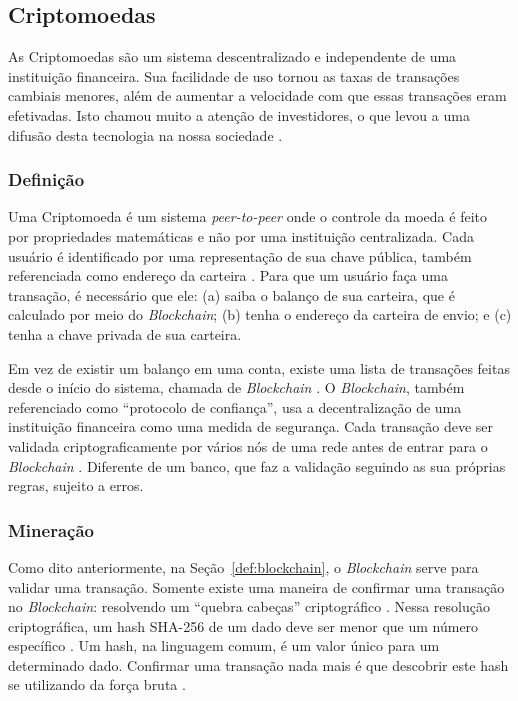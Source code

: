 \documentclass[
article,			%
12pt,				%
openright,			%
oneside,			%
a4paper,			%
chapter=TITLE,		%
section=TITLE,		%
subsection=TITLE,	%
subsubsection=TITLE,%
subsubsubsection=TITLE, %
english,			%
brazil,				%
]{abntex2}
\begin{document}
\subsection{Criptomoedas}

As Criptomoedas são um sistema descentralizado e independente de uma
instituição financeira. Sua facilidade de uso tornou as taxas de
transações cambiais menores, além de aumentar a velocidade com que
essas transações eram efetivadas. Isto chamou muito a atenção de
investidores, o que levou a uma difusão desta tecnologia na nossa
sociedade \cite{Nakamoto2008, Prado2017}.

\subsubsection{Definição}

Uma Criptomoeda é um sistema \emph{peer-to-peer} onde o controle da
moeda é feito por propriedades matemáticas e não por uma instituição
centralizada. Cada usuário é identificado por uma representação de sua
chave pública, também referenciada como endereço da carteira
\cite{Weber2012}. Para que um usuário faça uma transação, é necessário
que ele: (a) saiba o balanço de sua carteira, que é calculado por meio
do \emph{Blockchain}; (b) tenha o endereço da carteira de envio; e (c)
tenha a chave privada de sua carteira.

Em vez de existir um balanço em uma conta, existe uma lista de
transações feitas desde o início do sistema, chamada de
\emph{Blockchain} \cite{Weber2012}\label{def:blockchain}. O
\emph{Blockchain}, também referenciado como ``protocolo de
confiança'', usa a decentralização de uma instituição financeira como
uma medida de segurança. Cada transação deve ser validada
criptograficamente por vários nós de uma rede antes de entrar para o
\emph{Blockchain} \cite{LChicarino}. Diferente de um banco, que faz a
validação seguindo as sua próprias regras, sujeito a erros.

\subsubsection{Mineração}

Como dito anteriormente, na Seção~\ref{def:blockchain}, o
\emph{Blockchain} serve para validar uma transação. Somente existe uma
maneira de confirmar uma transação no \emph{Blockchain}: resolvendo um
``quebra cabeças'' criptográfico \cite{Weber2012}. Nessa resolução
criptográfica, um hash SHA-256 de um dado deve ser menor que um número
específico \cite{Dev2014}. Um hash, na linguagem comum, é um valor
único para um determinado dado.  Confirmar uma transação nada mais é
que descobrir este hash se utilizando da força bruta \cite{Arsov}.
\end{document}
